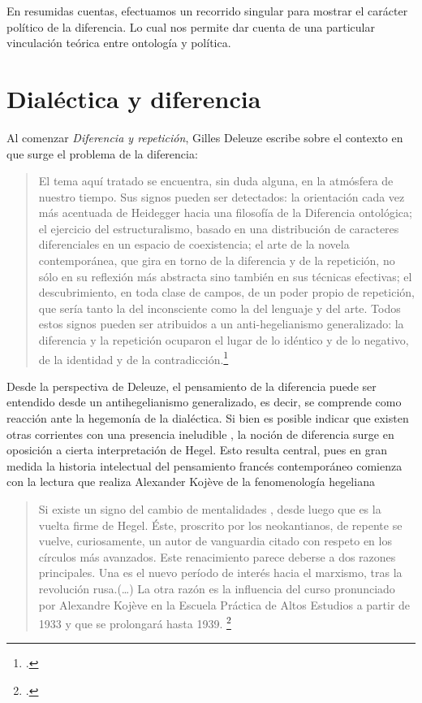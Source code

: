 En resumidas cuentas, efectuamos un recorrido singular para mostrar el carácter político de la diferencia. Lo cual nos permite dar cuenta de una particular vinculación teórica entre ontología y política.

\section{Dialéctica y diferencia}

Al comenzar \emph{Diferencia y repetición}, Gilles Deleuze escribe sobre el contexto en que surge el problema de la diferencia:

\begin{quote}
El tema aquí tratado se encuentra, sin duda alguna, en la atmósfera de nuestro tiempo. Sus signos pueden ser detectados: la orientación cada vez más acentuada de Heidegger hacia una filosofía de la Diferencia ontológica; el ejercicio del estructuralismo, basado en una distribución de caracteres diferenciales en un espacio de coexistencia; el arte de la novela contemporánea, que gira en torno de la diferencia y de la repetición, no sólo en su reflexión más abstracta sino también en sus técnicas efectivas; el descubrimiento, en toda clase de campos, de un poder propio de repetición, que sería tanto la del inconsciente como la del lenguaje y del arte. Todos estos signos pueden ser atribuidos a un anti-hegelianismo generalizado: la diferencia y la repetición ocuparon el lugar de lo idéntico y de lo negativo, de la identidad y de la contradicción.\footcite[15]{@6961-DELEUZE2002}
\end{quote}

Desde la perspectiva de Deleuze, el pensamiento de la diferencia puede ser entendido desde un antihegelianismo generalizado, es decir, se comprende como reacción ante la hegemonía de la dialéctica. Si bien es posible indicar que existen otras corrientes con una presencia ineludible , la noción de diferencia surge en oposición a cierta interpretación de Hegel. Esto resulta central, pues en gran medida la historia intelectual del pensamiento francés contemporáneo comienza con la lectura que realiza Alexander Kojève de la fenomenología hegeliana

\begin{quote}
Si existe un signo del cambio de mentalidades , desde luego que es la vuelta firme de Hegel. Éste, proscrito por los neokantianos, de repente se vuelve, curiosamente, un autor de vanguardia citado con respeto en los círculos más avanzados. Este renacimiento parece deberse a dos razones principales. Una es el nuevo período de interés hacia el marxismo, tras la revolución rusa.(\dots) La otra razón es la influencia del curso pronunciado por Alexandre Kojève en la Escuela Práctica de Altos Estudios a partir de 1933 y que se prolongará hasta 1939. \footcite[28]{@6962-DESCOMBES1998}
\end{quote}

